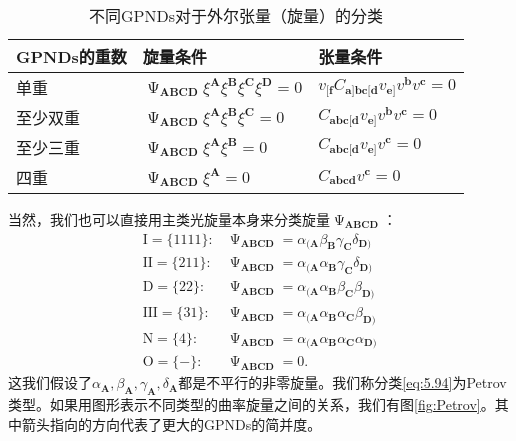 \begin{table}[h]
	\centering
	\begin{tabularx}{\textwidth}{KKK}
		\toprule 
		GPNDs的重数 & 旋量条件 & 张量条件 \\
		\midrule 
		单重 & $\upPsi _{\boldsymbol{ABCD}} \xi ^{\boldsymbol{A}} \xi ^{\boldsymbol{B}} \xi ^{\boldsymbol{C}} \xi ^{\boldsymbol{D}} =0$ & $v_{[\boldsymbol{f}} C_{\boldsymbol{a}]\boldsymbol{bc}[\boldsymbol{d}} v_{\boldsymbol{e}]} v^{\boldsymbol{b}} v^{\boldsymbol{c}} =0$ \\
		至少双重 & $\upPsi _{\boldsymbol{ABCD}} \xi ^{\boldsymbol{A}} \xi ^{\boldsymbol{B}} \xi ^{\boldsymbol{C}} =0$ & $C_{\boldsymbol{abc}[\boldsymbol{d}} v_{\boldsymbol{e}]} v^{\boldsymbol{b}} v^{\boldsymbol{c}} =0$ \\
		至少三重 & $\upPsi _{\boldsymbol{ABCD}} \xi ^{\boldsymbol{A}} \xi ^{\boldsymbol{B}} =0$ & $C_{\boldsymbol{abc}[\boldsymbol{d}} v_{\boldsymbol{e}]} v^{\boldsymbol{c}} =0$ \\
		四重 & $\upPsi _{\boldsymbol{ABCD}} \xi ^{\boldsymbol{A}} =0$ & $C_{\boldsymbol{abcd}} v^{\boldsymbol{c}} =0$ \\
		\bottomrule
		\end{tabularx}
	\caption{不同GPNDs对于外尔张量（旋量）的分类}
	\label{tab:classification of Weyl tensor}
\end{table}

当然，我们也可以直接用主类光旋量本身来分类旋量$\upPsi _{\boldsymbol{ABCD}}$：
\begin{equation}
	\begin{aligned}
		\text{I} =\{1111\} : & \upPsi _{\boldsymbol{ABCD}} =\alpha _{(\boldsymbol{A}} \beta _{\boldsymbol{B}} \gamma _{\boldsymbol{C}} \delta _{\boldsymbol{D})}\\
		\text{II} =\{211\} : & \upPsi _{\boldsymbol{ABCD}} =\alpha _{(\boldsymbol{A}} \alpha _{\boldsymbol{B}} \gamma _{\boldsymbol{C}} \delta _{\boldsymbol{D})}\\
		\text{D} =\{22\} : & \upPsi _{\boldsymbol{ABCD}} =\alpha _{(\boldsymbol{A}} \alpha _{\boldsymbol{B}} \beta _{\boldsymbol{C}} \beta _{\boldsymbol{D})}\\
		\text{III} =\{31\} : & \upPsi _{\boldsymbol{ABCD}} =\alpha _{(\boldsymbol{A}} \alpha _{\boldsymbol{B}} \alpha _{\boldsymbol{C}} \beta _{\boldsymbol{D})}\\
		\text{N} =\{4\} : & \upPsi _{\boldsymbol{ABCD}} =\alpha _{(\boldsymbol{A}} \alpha _{\boldsymbol{B}} \alpha _{\boldsymbol{C}} \alpha _{\boldsymbol{D})}\\
		\text{O} =\{-\} : & \upPsi _{\boldsymbol{ABCD}} =0.
	\end{aligned}
	\label{eq:5.94}
\end{equation}
这我们假设了$\alpha _{\boldsymbol{A}} ,\beta _{\boldsymbol{A}} ,\gamma _{\boldsymbol{A}} ,\delta _{\boldsymbol{A}}$都是不平行的非零旋量。我们称分类\ref{eq:5.94}为Petrov类型。如果用图形表示不同类型的曲率旋量之间的关系，我们有图\ref{fig:Petrov}。其中箭头指向的方向代表了更大的GPNDs的简并度。

